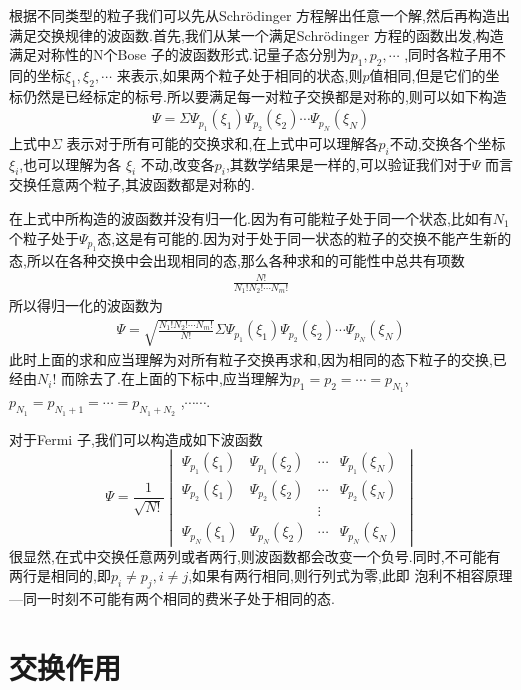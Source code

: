根据不同类型的粒子我们可以先从Schr\"odinger 方程解出任意一个解,然后再构造出满足交换规律的波函数.首先,我们从某一个满足Schr\"odinger 方程的函数出发,构造满足对称性的N个Bose 子的波函数形式.记量子态分别为$p_1,p_2,\cdots $ ,同时各粒子用不同的坐标$\xi_1,\xi_2,\cdots $ 来表示,如果两个粒子处于相同的状态,则$p$值相同,但是它们的坐标仍然是已经标定的标号.所以要满足每一对粒子交换都是对称的,则可以如下构造
\begin{gather}
  \Psi = \Sigma \Psi_{p_1}(\xi_1)\Psi_{p_2}(\xi_2)\cdots\Psi_{p_N}(\xi_N) 
\end{gather}
上式中$\Sigma$ 表示对于所有可能的交换求和,在上式中可以理解各$p_i$不动,交换各个坐标$\xi_i$,也可以理解为各 $\xi_i$ 不动,改变各$p_i$,其数学结果是一样的,可以验证我们对于$\Psi$ 而言交换任意两个粒子,其波函数都是对称的.

在上式中所构造的波函数并没有归一化.因为有可能粒子处于同一个状态,比如有$N_1$个粒子处于$\Psi_{p_1}$态,这是有可能的.因为对于处于同一状态的粒子的交换不能产生新的态,所以在各种交换中会出现相同的态,那么各种求和的可能性中总共有项数
\begin{gather}
  \frac{N!}{N_1!N_2!\cdots N_m!} 
\end{gather}
所以得归一化的波函数为
\begin{gather}
  \Psi =\sqrt{\frac{N_1!N_2!\cdots N_m!}{N!}} \Sigma \Psi_{p_1}(\xi_1)\Psi_{p_2}(\xi_2)\cdots\Psi_{p_N}(\xi_N) 
\end{gather}
此时上面的求和应当理解为对所有粒子交换再求和,因为相同的态下粒子的交换,已经由$N_i!$ 而除去了.在上面的下标中,应当理解为$p_1=p_2=\cdots =p_{N_1}$,$p_{N_1}=p_{N_1+1}=\cdots =p_{N_1+N_2}$ ,$\cdots \cdots$.

对于Fermi 子,我们可以构造成如下波函数
\begin{equation}
  \Psi=\frac{1}{\sqrt{N!}}
  \begin{vmatrix}
    \Psi_{p_1}(\xi_1)&\Psi_{p_1}(\xi_2)&\cdots&\Psi_{p_1}(\xi_N)\\
    \Psi_{p_2}(\xi_1)&\Psi_{p_2}(\xi_2)&\cdots&\Psi_{p_2}(\xi_N)\\
    &&\vdots &\\
    \Psi_{p_N}(\xi_1)&\Psi_{p_N}(\xi_2)&\cdots&\Psi_{p_N}(\xi_N)
  \end{vmatrix}
\end{equation}
很显然,在式中交换任意两列或者两行,则波函数都会改变一个负号.同时,不可能有两行是相同的,即$p_i\neq p_j, i\neq j$,如果有两行相同,则行列式为零,此即 泡利不相容原理---同一时刻不可能有两个相同的费米子处于相同的态.

\section{交换作用}

